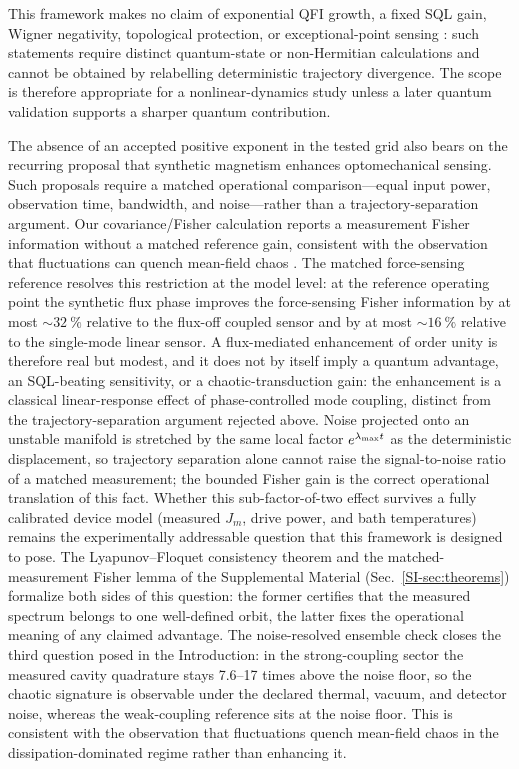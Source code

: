 \documentclass[aip,cha,reprint]{revtex4-2}
\begin{document}
This framework makes no claim of exponential QFI growth, a fixed SQL gain,
Wigner negativity, topological protection, or exceptional-point sensing
\cite{chen2017,liu2016,kononchuk2022,oezdemir2019}: such statements require
distinct quantum-state or non-Hermitian calculations and cannot be obtained by
relabelling deterministic trajectory divergence. The scope is therefore appropriate for a nonlinear-dynamics
study unless a later quantum validation supports a sharper quantum contribution.

The absence of an accepted positive exponent in the tested grid also bears on the
recurring proposal that synthetic magnetism enhances optomechanical sensing. Such
proposals \cite{Xu2025,muthukumar2025doi} require a matched operational comparison---equal input power,
observation time, bandwidth, and noise---rather than a trajectory-separation
argument. Our covariance/Fisher calculation reports a measurement Fisher information
without a matched reference gain, consistent with the observation that fluctuations can quench mean-field chaos
\cite{gao2026doi}. The matched force-sensing reference resolves this
restriction at the model level: at the reference operating point the synthetic flux
phase improves the force-sensing Fisher information by at most
$\sim\SI{32}{\percent}$ relative to the flux-off coupled sensor and by at most
$\sim\SI{16}{\percent}$ relative to the single-mode linear sensor. A flux-mediated
enhancement of order unity is therefore real but modest, and it does not by itself
imply a quantum advantage, an SQL-beating sensitivity, or a chaotic-transduction
gain: the enhancement is a classical linear-response effect of phase-controlled
mode coupling, distinct from the trajectory-separation argument rejected above. Noise projected onto an unstable manifold is stretched by the same local factor $e^{\lambda_{\rm max}t}$ as the deterministic displacement, so trajectory separation alone cannot raise the signal-to-noise ratio of a matched measurement; the bounded Fisher gain is the correct operational translation of this fact.
Whether this sub-factor-of-two effect survives a fully calibrated device model
(measured $J_m$, drive power, and bath temperatures) remains the experimentally
addressable question that this framework is designed to pose. The
Lyapunov--Floquet consistency theorem and the matched-measurement Fisher lemma of
the Supplemental Material (Sec.~\ref{SI-sec:theorems}) formalize both sides of this
question: the former certifies that the measured spectrum belongs to one
well-defined orbit, the latter fixes the operational meaning of any claimed
advantage. The noise-resolved ensemble check closes the third question posed in
the Introduction: in the strong-coupling sector the measured cavity quadrature
stays \num{7.6}--\num{17} times above the noise floor, so the chaotic signature is
observable under the declared thermal, vacuum, and detector noise, whereas the
weak-coupling reference sits at the noise floor. This is consistent with the
observation that fluctuations quench mean-field chaos in the dissipation-dominated
regime rather than enhancing it.
\end{document}
